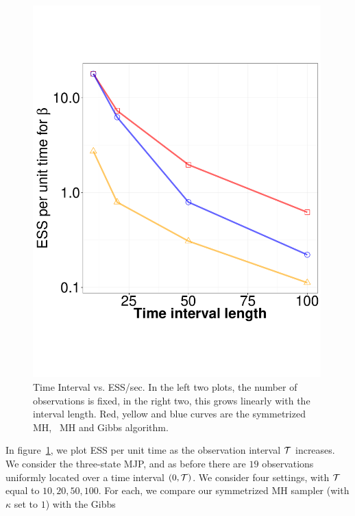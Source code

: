 {\begin{figure}
\begin{minipage}[hp]{0.24\linewidth}
    \includegraphics [width=0.99\textwidth, angle=0]{figs/ESS_vs_t_beta.pdf}
  \end{minipage}
    \vspace{-0.3in}
    \caption{Time Interval vs. ESS/sec. In the left two plots, the number of 
    observations is fixed, in the right two, this grows linearly with the
  interval length. Red, yellow and blue curves are the symmetrized MH,
  \naive\ MH and Gibbs algorithm.}
     \label{fig:TSS}
  \end{figure}
In figure~\ref{fig:TSS}, we plot ESS per unit time as the observation 
interval ${\mathcal T}$ increases. We consider the three-state MJP, and as before there 
are $19$ observations uniformly located over a time interval $(0,{\mathcal T})$. We 
consider four settings, with ${\mathcal T}$ equal to $10, 20, 50, 100$. For each, we 
compare our symmetrized MH sampler (with $\kappa$ set to $1$) with the Gibbs 
}
